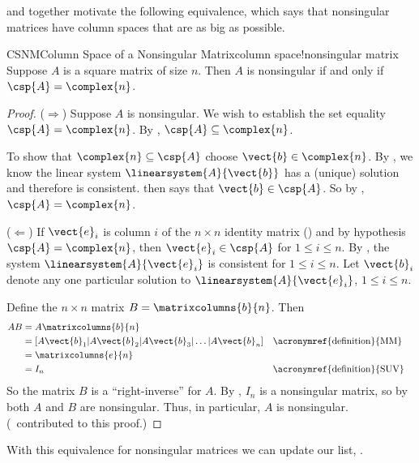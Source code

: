 %
 and  together motivate the following equivalence, which says that nonsingular matrices have column spaces that are as big as possible.
%
\begin{theorem}{CSNM}{Column Space of a Nonsingular Matrix}{column space!nonsingular matrix}
%
Suppose $A$ is a square matrix of size $n$.  Then $A$ is nonsingular if and only if $\csp{A}=\complex{n}$.
\end{theorem}
%
\begin{proof}
($\Rightarrow$)  Suppose $A$ is nonsingular.  We wish to establish the set equality $\csp{A}=\complex{n}$.  By , $\csp{A}\subseteq\complex{n}$.\par
%
To show that  $\complex{n}\subseteq\csp{A}$ choose $\vect{b}\in\complex{n}$.  By , we know the linear system $\linearsystem{A}{\vect{b}}$ has a (unique) solution and therefore is consistent.   then says that $\vect{b}\in\csp{A}$.  So  by , $\csp{A}=\complex{n}$.\par
%
($\Leftarrow$)  If $\vect{e}_i$ is column $i$ of the $n\times n$ identity matrix () and by hypothesis $\csp{A}=\complex{n}$, then $\vect{e}_i\in\csp{A}$ for $1\leq i\leq n$.  By , the system $\linearsystem{A}{\vect{e}_i}$ is consistent for $1\leq i\leq n$.   Let $\vect{b}_i$ denote any one particular solution to $\linearsystem{A}{\vect{e}_i}$, $1\leq i\leq n$.\par
%
Define the $n\times n$ matrix $B=\matrixcolumns{b}{n}$.  Then
%
\begin{align*}
AB
&=A\matrixcolumns{b}{n}\\
&=[A\vect{b}_1|A\vect{b}_2|A\vect{b}_3|\ldots|A\vect{b}_n]&&\text{\acronymref{definition}{MM}}\\
&=\matrixcolumns{e}{n}\\
&=I_n&&\text{\acronymref{definition}{SUV}}\\
\end{align*}
%
So the matrix $B$ is a ``right-inverse'' for $A$.  By , $I_n$ is a nonsingular matrix, so by  both $A$ and $B$ are nonsingular.  Thus, in particular, $A$ is nonsingular.  (\travisosborne\ contributed to this proof.)
%
\end{proof}
%
With this equivalence for nonsingular matrices we can update our list, .
